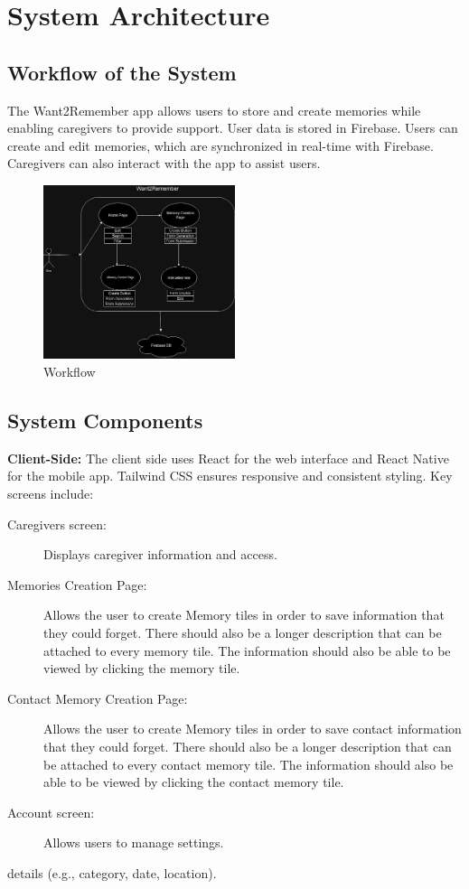 \documentclass{article}
\begin{document}
\section{System Architecture}
\subsection{Workflow of the System}
The Want2Remember app allows users to store and create memories while enabling caregivers to provide support. User data is stored in Firebase. Users can create and edit memories, which are synchronized in real-time with Firebase. Caregivers can also interact with the app to assist users.

\begin{figure}[h!]
\includegraphics[width=0.5\textwidth]{snapshot4img4.jpg}
\caption{Workflow}
\end{figure}

\subsection{System Components}
\textbf{Client-Side:} 
The client side uses React for the web interface and React Native for the mobile app. Tailwind CSS ensures responsive and consistent styling. Key screens include:
\begin{description}
\item[Caregivers screen:] Displays caregiver information and access.
\item[Memories Creation Page:] Allows the user to create Memory tiles in order to save information that they could forget. There should also be a longer description that can be attached to every memory tile. The information should also be able to be viewed by clicking the memory tile.
\item[Contact Memory Creation Page:] Allows the user to create Memory tiles in order to save contact information that they could forget. There should also be a longer description that can be attached to every contact memory tile. The information should also be able to be viewed by clicking the contact memory tile.
\item[Account screen:] Allows users to manage settings.
\end{description} details (e.g., category, date, location).
\end{document}
